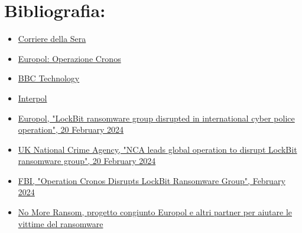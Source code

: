 \documentclass[a4paper,12pt,twoside]{article}
\begin{document}
\section{Bibliografia:}
\begin{itemize}
    \item \href{https://www.corriere.it/tecnologia/23_dicembre_19/chi-sono-i-russi-di-lockbit-hacker-che-hanno-bloccato-la-pubblica-amministrazione-politica-contano-solo-i-soldi-695b2492-8908-4e12-993c-5cb23941dxlk.shtml}{Corriere della Sera}
    \item \href{https://www.europol.europa.eu/media-press/newsroom/news/lockbit-ransomware-group-disrupted-in-international-cyber-police-operation}{Europol: Operazione Cronos}
    \item \href{https://www.bbc.com/news/technology-68322223}{BBC Technology}
    \item \href{https://www.interpol.int/en/News-and-Events/News/2024/Global-Operation-Cronos-strikes-Lockbit}{Interpol}
     \item \href{https://www.europol.europa.eu/media-press/newsroom/news/lockbit-ransomware-group-disrupted-in-international-cyber-police-operation}{Europol, "LockBit ransomware group disrupted in international cyber police operation", 20 February 2024}
    \item \href{https://www.nca.gov.uk/news/nca-leads-global-operation-disrupt-lockbit-ransomware-group}{UK National Crime Agency, "NCA leads global operation to disrupt LockBit ransomware group", 20 February 2024}
    \item \href{https://www.fbi.gov/news/stories/lockbit-takedown-february-2024}{FBI, "Operation Cronos Disrupts LockBit Ransomware Group", February 2024}
    \item \href{https://www.nomoreransom.org/en/index.html}{No More Ransom, progetto congiunto Europol e altri partner per aiutare le vittime del ransomware}
\end{itemize}
\end{document}
